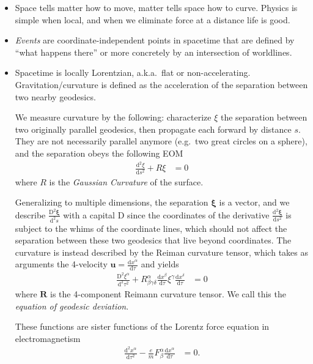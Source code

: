 \documentclass[12pt]{report}
\newcommand{\rd}[2]{\frac{\mathrm{d}#1}{\mathrm{d}#2}}
\newcommand{\rtd}[2]{\frac{\mathrm{d}^2#1}{\mathrm{d}#2^2}}
\begin{document}
\begin{itemize}
    \item Space tells matter how to move, matter tells space how to curve.
        Physics is simple when local, and when we eliminate force at a distance
        life is good.

    \item \emph{Events} are coordinate-independent points in spacetime that are
        defined by ``what happens there'' or more concretely by an intersection
        of worldlines.

    \item Spacetime is locally Lorentzian, a.k.a.\ flat or non-accelerating.
        Gravitation/curvature is defined as the acceleration of the separation
        between two nearby geodesics.

        We measure curvature by the following: characterize $\xi$ the separation
        between two originally parallel geodesics, then propagate each forward
        by distance $s$. They are not necessarily parallel anymore (e.g.\ two
        great circles on a sphere), and the separation obeys the following EOM
        \begin{align}
            \rtd{\xi}{s} + R\xi &= 0
        \end{align}
        where $R$ is the \emph{Gaussian Curvature} of the surface.

        Generalizing to multiple dimensions, the separation $\mathbf{\xi}$ is a
        vector, and we describe $\frac{\mathrm{D}^2\mathbf{\xi}}{\mathrm{d}^2s}$
        with a capital $\mathrm{D}$ since the coordinates of the derivative
        $\rtd{\mathbf{\xi}}{s}$ is subject to the whims of the coordinate lines,
        which should not affect the separation between these two geodesics that
        live beyond coordinates. The curvature is instead described by the
        Reiman curvature tensor, which takes as arguments the 4-velocity
        $\mathbf{u} = \rd{x^\alpha}{\tau}$ and yields
        \begin{align}
            \frac{\mathrm{D}^2\xi^\alpha}{\mathrm{d}^2\tau^2} +
                R^{\alpha}_{\beta\gamma\delta}
                \rd{x^\beta}{\tau}\xi^\gamma \rd{x^\delta}{\tau} &= 0
        \end{align}
        where $\mathbf{R}$ is the 4-component Reimann curvature tensor. We call
        this the \emph{equation of geodesic deviation}.

        These functions are sister functions of the Lorentz force equation in
        electromagnetism
        \begin{align*}
            \rtd{x^\alpha}{\tau} - \frac{e}{m}F^\alpha_\beta \rd{x^\alpha}{\tau}
                &= 0.
        \end{align*}


\end{itemize}
\end{document}
